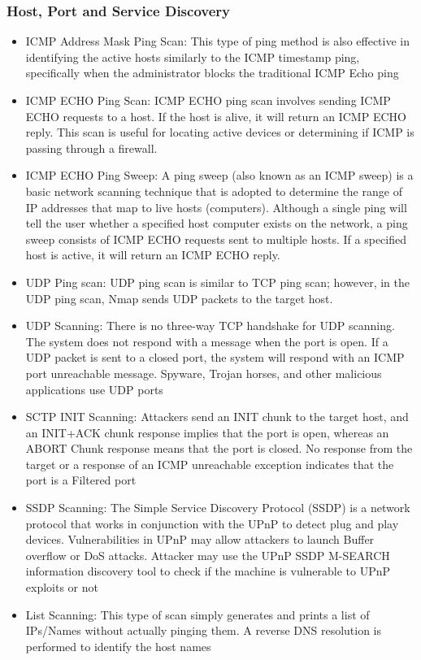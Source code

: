 \subsubsection{Host, Port and Service Discovery}
\begin{itemize}
    \item ICMP Address Mask Ping Scan: This type of ping method is also effective in identifying the active hosts similarly to the ICMP timestamp ping, specifically when the administrator blocks the traditional ICMP Echo ping
    \item ICMP ECHO Ping Scan: ICMP ECHO ping scan involves sending ICMP ECHO requests to a host. If the host is alive, it will return an ICMP ECHO reply. This scan is useful for locating active devices or determining if ICMP is passing through a firewall.
    \item ICMP ECHO Ping Sweep: A ping sweep (also known as an ICMP sweep) is a basic network scanning technique that is adopted to determine the range of IP addresses that map to live hosts (computers). Although a single ping will tell the user whether a specified host computer exists on the network, a ping sweep consists of ICMP ECHO requests sent to multiple hosts. If a specified host is active, it will return an ICMP ECHO reply.
    \item UDP Ping scan: UDP ping scan is similar to TCP ping scan; however, in the UDP ping scan, Nmap sends UDP packets to the target host.
    \item UDP Scanning: There is no three-way TCP handshake for UDP scanning. The system does not respond with a message when the port is open. If a UDP packet is sent to a closed port, the system will respond with an ICMP port unreachable message. Spyware, Trojan horses, and other malicious applications use UDP ports
    \item SCTP INIT Scanning: Attackers send an INIT chunk to the target host, and an INIT+ACK chunk response implies that the port is open, whereas an ABORT Chunk response means that the port is closed. No response from the target or a response of an ICMP unreachable exception indicates that the port is a Filtered port
    \item SSDP Scanning: The Simple Service Discovery Protocol (SSDP) is a network protocol that works in conjunction with the UPnP to detect plug and play devices. Vulnerabilities in UPnP may allow attackers to launch Buffer overflow or DoS attacks. Attacker may use the UPnP SSDP M-SEARCH information discovery tool to check if the machine is vulnerable to UPnP exploits or not
    \item List Scanning: This type of scan simply generates and prints a list of IPs/Names without actually pinging them. A reverse DNS resolution is performed to identify the host names
\end{itemize}
